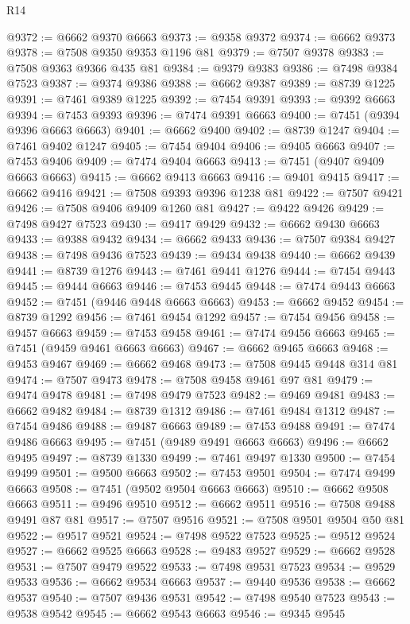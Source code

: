\begin{lexlean}{R14}
\begin{coremodule}
{{{{{{{{{{{{{{{{{{{{{{{{{{{{{{{{{{{{{{{{{{{{{{{{{{{{{{{{{{{{{{{{{{{{{{{{{{{{{{{{{{@9372 := @6662 @9370 @6663
@9373 := @9358 @9372
@9374 := @6662 @9373
@9378 := @7508 @9350 @9353 @1196 @81
@9379 := @7507 @9378
@9383 := @7508 @9363 @9366 @435 @81
@9384 := @9379 @9383
@9386 := @7498 @9384 @7523
@9387 := @9374 @9386
@9388 := @6662 @9387
@9389 := @8739 @1225
@9391 := @7461 @9389 @1225
@9392 := @7454 @9391
@9393 := @9392 @6663
@9394 := @7453 @9393
@9396 := @7474 @9391 @6663
@9400 := @7451 (@9394 @9396 @6663 @6663)
@9401 := @6662 @9400
@9402 := @8739 @1247
@9404 := @7461 @9402 @1247
@9405 := @7454 @9404
@9406 := @9405 @6663
@9407 := @7453 @9406
@9409 := @7474 @9404 @6663
@9413 := @7451 (@9407 @9409 @6663 @6663)
@9415 := @6662 @9413 @6663
@9416 := @9401 @9415
@9417 := @6662 @9416
@9421 := @7508 @9393 @9396 @1238 @81
@9422 := @7507 @9421
@9426 := @7508 @9406 @9409 @1260 @81
@9427 := @9422 @9426
@9429 := @7498 @9427 @7523
@9430 := @9417 @9429
@9432 := @6662 @9430 @6663
@9433 := @9388 @9432
@9434 := @6662 @9433
@9436 := @7507 @9384 @9427
@9438 := @7498 @9436 @7523
@9439 := @9434 @9438
@9440 := @6662 @9439
@9441 := @8739 @1276
@9443 := @7461 @9441 @1276
@9444 := @7454 @9443
@9445 := @9444 @6663
@9446 := @7453 @9445
@9448 := @7474 @9443 @6663
@9452 := @7451 (@9446 @9448 @6663 @6663)
@9453 := @6662 @9452
@9454 := @8739 @1292
@9456 := @7461 @9454 @1292
@9457 := @7454 @9456
@9458 := @9457 @6663
@9459 := @7453 @9458
@9461 := @7474 @9456 @6663
@9465 := @7451 (@9459 @9461 @6663 @6663)
@9467 := @6662 @9465 @6663
@9468 := @9453 @9467
@9469 := @6662 @9468
@9473 := @7508 @9445 @9448 @314 @81
@9474 := @7507 @9473
@9478 := @7508 @9458 @9461 @97 @81
@9479 := @9474 @9478
@9481 := @7498 @9479 @7523
@9482 := @9469 @9481
@9483 := @6662 @9482
@9484 := @8739 @1312
@9486 := @7461 @9484 @1312
@9487 := @7454 @9486
@9488 := @9487 @6663
@9489 := @7453 @9488
@9491 := @7474 @9486 @6663
@9495 := @7451 (@9489 @9491 @6663 @6663)
@9496 := @6662 @9495
@9497 := @8739 @1330
@9499 := @7461 @9497 @1330
@9500 := @7454 @9499
@9501 := @9500 @6663
@9502 := @7453 @9501
@9504 := @7474 @9499 @6663
@9508 := @7451 (@9502 @9504 @6663 @6663)
@9510 := @6662 @9508 @6663
@9511 := @9496 @9510
@9512 := @6662 @9511
@9516 := @7508 @9488 @9491 @87 @81
@9517 := @7507 @9516
@9521 := @7508 @9501 @9504 @50 @81
@9522 := @9517 @9521
@9524 := @7498 @9522 @7523
@9525 := @9512 @9524
@9527 := @6662 @9525 @6663
@9528 := @9483 @9527
@9529 := @6662 @9528
@9531 := @7507 @9479 @9522
@9533 := @7498 @9531 @7523
@9534 := @9529 @9533
@9536 := @6662 @9534 @6663
@9537 := @9440 @9536
@9538 := @6662 @9537
@9540 := @7507 @9436 @9531
@9542 := @7498 @9540 @7523
@9543 := @9538 @9542
@9545 := @6662 @9543 @6663
@9546 := @9345 @9545
}}}}}}}}}}}}}}}}}}}}}}}}}}}}}}}}}}}}}}}}}}}}}}}}}}}}}}}}}}}}}}}}}}}}}}}}}}}}}}}}}}
\end{coremodule}
\end{lexlean}
